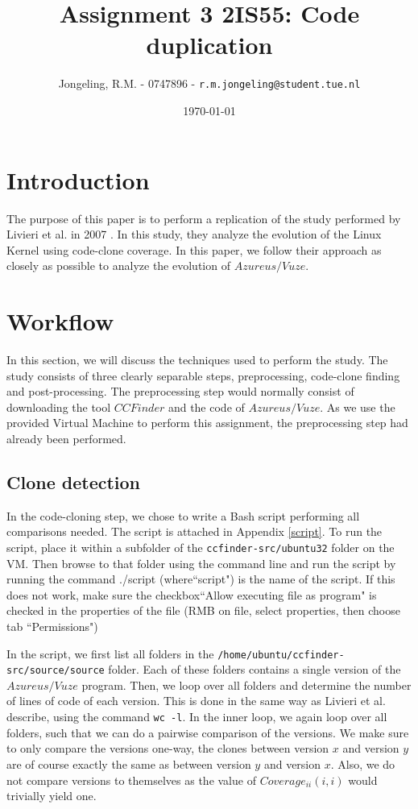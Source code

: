 \documentclass[a4paper,twoside, twocolumn, 11pt]{article}
\title{\vspace{-\baselineskip}\sffamily\bfseries Assignment 3 2IS55: Code duplication}
\author{Jongeling, R.M. - 0747896 - {\tt r.m.jongeling@student.tue.nl}}
\date{\today}
\numberwithin{equation}{section}
\begin{document}
\maketitle

\begin{abstract}

\end{abstract}

\section{Introduction}
The purpose of this paper is to perform a replication of the study performed by Livieri et al. in 2007 \cite{paper}.
In this study, they analyze the evolution of the Linux Kernel using code-clone coverage.
In this paper, we follow their approach as closely as possible to analyze the evolution of $Azureus/Vuze$.

\section{Workflow}
In this section, we will discuss the techniques used to perform the study.
The study consists of three clearly separable steps, preprocessing, code-clone finding and post-processing.
The preprocessing step would normally consist of downloading the tool $CCFinder$ and the code of $Azureus/Vuze$.
As we use the provided Virtual Machine to perform this assignment, the preprocessing step had already been performed.

\subsection{Clone detection}
In the code-cloning step, we chose to write a Bash script performing all comparisons needed.
The script is attached in Appendix \ref{script}.
To run the script, place it within a subfolder of the \texttt{ccfinder-src/ubuntu32} folder on the VM. 
Then browse to that folder using the command line and run the script by running the command ./script (where``script") is the name of the script.
If this does not work, make sure the checkbox``Allow executing file as program" is checked in the properties of the file (RMB on file, select properties, then choose tab ``Permissions")

In the script, we first list all folders in the \texttt{/home/ubuntu/ccfinder-src/source/source} folder.
Each of these folders contains a single version of the $Azureus/Vuze$ program.
Then, we loop over all folders and determine the number of lines of code of each version.
This is done in the same way as Livieri et al. describe, using the command \texttt{wc -l}.
In the inner loop, we again loop over all folders, such that we can do a pairwise comparison of the versions.
We make sure to only compare the versions one-way, the clones between version $x$ and version $y$ are of course exactly the same as between version $y$ and version $x$.
Also, we do not compare versions to themselves as the value of $Coverage_{ii}(i,i)$ would trivially yield one.
\end{document}
